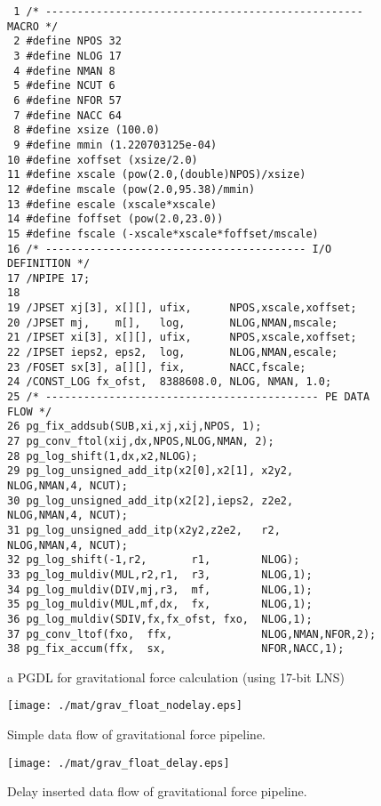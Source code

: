 \documentclass{llncs}
\begin{document}
\begin{figure}
\scriptsize
{\tiny
\begin{verbatim}
 1 /* -------------------------------------------------- MACRO */
 2 #define NPOS 32
 3 #define NLOG 17
 4 #define NMAN 8
 5 #define NCUT 6
 6 #define NFOR 57
 7 #define NACC 64
 8 #define xsize (100.0)
 9 #define mmin (1.220703125e-04)
10 #define xoffset (xsize/2.0)
11 #define xscale (pow(2.0,(double)NPOS)/xsize)
12 #define mscale (pow(2.0,95.38)/mmin)
13 #define escale (xscale*xscale)
14 #define foffset (pow(2.0,23.0))
15 #define fscale (-xscale*xscale*foffset/mscale)
16 /* ----------------------------------------- I/O DEFINITION */
17 /NPIPE 17;
18
19 /JPSET xj[3], x[][], ufix,      NPOS,xscale,xoffset;
20 /JPSET mj,    m[],   log,       NLOG,NMAN,mscale;
21 /IPSET xi[3], x[][], ufix,      NPOS,xscale,xoffset;
22 /IPSET ieps2, eps2,  log,       NLOG,NMAN,escale;
23 /FOSET sx[3], a[][], fix,       NACC,fscale;
24 /CONST_LOG fx_ofst,  8388608.0, NLOG, NMAN, 1.0;
25 /* ------------------------------------------- PE DATA FLOW */
26 pg_fix_addsub(SUB,xi,xj,xij,NPOS, 1);
27 pg_conv_ftol(xij,dx,NPOS,NLOG,NMAN, 2);
28 pg_log_shift(1,dx,x2,NLOG);
29 pg_log_unsigned_add_itp(x2[0],x2[1], x2y2,   NLOG,NMAN,4, NCUT);
30 pg_log_unsigned_add_itp(x2[2],ieps2, z2e2,   NLOG,NMAN,4, NCUT);
31 pg_log_unsigned_add_itp(x2y2,z2e2,   r2,     NLOG,NMAN,4, NCUT);
32 pg_log_shift(-1,r2,       r1,        NLOG);
33 pg_log_muldiv(MUL,r2,r1,  r3,        NLOG,1);
34 pg_log_muldiv(DIV,mj,r3,  mf,        NLOG,1);
35 pg_log_muldiv(MUL,mf,dx,  fx,        NLOG,1);
36 pg_log_muldiv(SDIV,fx,fx_ofst, fxo,  NLOG,1);
37 pg_conv_ltof(fxo,  ffx,              NLOG,NMAN,NFOR,2);
38 pg_fix_accum(ffx,  sx,               NFOR,NACC,1);
\end{verbatim}
}
\caption{a PGDL for gravitational force calculation (using 17-bit LNS)}
\label{figgrav5_pgdl}
\end{figure}

\begin{figure}[htb]
\begin{center}
\texttt{[image: ./mat/grav\_float\_nodelay.eps]}
\caption{Simple data flow of gravitational force pipeline.}
\label{fig_grav_float_nodelay}
\end{center}
\end{figure}

\begin{figure}[htb]
\begin{center}
\texttt{[image: ./mat/grav\_float\_delay.eps]}
\caption{Delay inserted data flow of gravitational force pipeline.}
\label{fig_grav_float_delay}
\end{center}
\end{figure}
\end{document}
